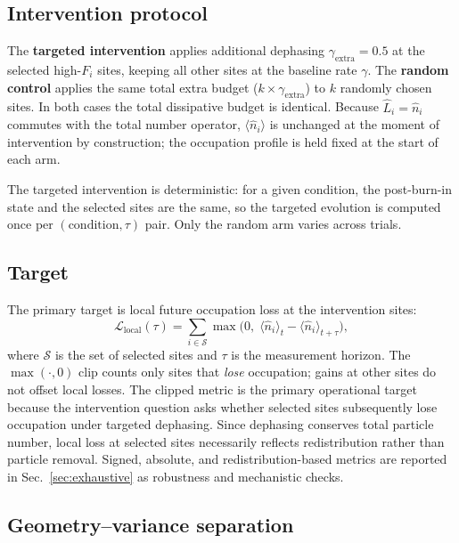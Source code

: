 \documentclass[aps,pra,reprint,amsmath,amssymb,longbibliography,floatfix]{revtex4-2}
\newcommand{\Fi}{F_i}
\newcommand{\nop}{\hat{n}}
\newcommand{\Lop}{\hat{L}}
\begin{document}
\subsection{Intervention protocol}

The \textbf{targeted intervention} applies additional dephasing
$\gamma_{\mathrm{extra}}=0.5$ at the selected high-$\Fi$ sites, keeping
all other sites at the baseline rate $\gamma$.
The \textbf{random control} applies the same total extra budget
($k\times\gamma_{\mathrm{extra}}$) to $k$ randomly chosen sites.
In both cases the total dissipative budget is identical.
Because $\Lop_i=\nop_i$ commutes with the total number operator,
$\langle\nop_i\rangle$ is unchanged at the moment of intervention by
construction; the occupation profile is held fixed at the start of each arm.

The targeted intervention is deterministic: for a given condition, the
post-burn-in state and the selected sites are the same, so the targeted
evolution is computed once per $(\text{condition},\tau)$ pair.
Only the random arm varies across trials.

\subsection{Target}

The primary target is local future occupation loss at the intervention
sites:
\begin{equation}
\label{eq:target}
\mathcal{L}_{\mathrm{local}}(\tau) =
  \sum_{i\in\mathcal{S}}
  \max\bigl(0,\;\langle\nop_i\rangle_t - \langle\nop_i\rangle_{t+\tau}\bigr),
\end{equation}
where $\mathcal{S}$ is the set of selected sites and $\tau$ is the
measurement horizon.
The $\max(\cdot,0)$ clip counts only sites that \emph{lose} occupation;
gains at other sites do not offset local losses.
The clipped metric is the primary operational target because the
intervention question asks whether selected sites subsequently lose
occupation under targeted dephasing.
Since dephasing conserves total particle number, local loss at selected
sites necessarily reflects redistribution rather than particle removal.
Signed, absolute, and redistribution-based metrics are reported in
Sec.~\ref{sec:exhaustive} as robustness and mechanistic checks.

\subsection{Geometry--variance separation}
\end{document}
